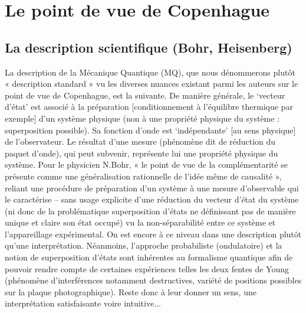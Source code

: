 \section{Le point de vue de Copenhague}
\subsection{La description scientifique (Bohr, Heisenberg)}
La description de la Mécanique Quantique (MQ), que nous dénommerons plutôt
« description standard » vu les diverses nuances existant parmi les auteurs sur le point de
vue de Copenhague, est la suivante. De manière générale, le ‘vecteur d’état’ est associé à la
préparation [conditionnement à l’équilibre thermique par exemple] d’un système physique
(non à une propriété physique du système : superposition possible). Sa fonction d’onde est
‘indépendante’ [au sens physique] de l’observateur. Le résultat d’une mesure (phénomène
dit de réduction du paquet d’onde), qui peut subvenir, représente lui une propriété physique
du système. Pour le physicien N.Bohr, « le point de vue de la complémentarité se présente
comme une généralisation rationnelle de l’idée même de causalité », reliant une procédure
de préparation d’un système à une mesure d’observable qui le caractérise – sans usage
explicite d’une réduction du vecteur d’état du système (ni donc de la problématique
superposition d’états ne définissant pas de manière unique et claire son état occupé) vu la
non-séparabilité entre ce système et l’appareillage expérimental. On est encore à ce niveau
dans une description plutôt qu’une interprétation. Néanmoins, l’approche probabiliste
(ondulatoire) et la notion de superposition d’états sont inhérentes au formalisme quantique
afin de pouvoir rendre compte de certaines expériences telles les deux fentes de Young
(phénomène d’interférences notamment destructives, variété de positions possibles sur la
plaque photographique). Reste donc à leur donner un sens, une interprétation satisfaisante
voire intuitive...
